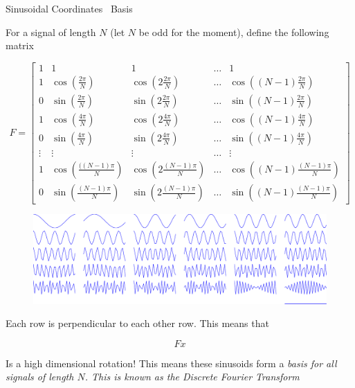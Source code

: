 \documentclass{beamer}
\begin{document}
\begin{frame}{Sinusoidal Coordinates \ Basis}

\tiny For a signal of length $N$ (let $N$ be odd for the moment), define the following matrix

\tiny
\[ F = \left[ \begin{array}{ccccc} 1 & 1 & 1 & \hdots & 1 \\ 1 & \cos(\frac{2\pi}{N}) & \cos(2\frac{2\pi}{N}) & \hdots & \cos((N-1)\frac{2\pi}{N})   \\ 0 & \sin(\frac{2\pi}{N}) & \sin(2\frac{2\pi}{N}) & \hdots & \sin((N-1)\frac{2\pi}{N}) \\ 

1 & \cos(\frac{4\pi}{N}) & \cos(2\frac{4\pi}{N}) & \hdots & \cos((N-1)\frac{4\pi}{N})   \\ 0 & \sin(\frac{4\pi}{N}) & \sin(2\frac{4\pi}{N}) & \hdots & \sin((N-1)\frac{4\pi}{N})

\\ \vdots & \vdots & \vdots & \hdots & \vdots \\

1 & \cos(\frac{((N-1)\pi}{N}) & \cos(2\frac{(N-1)\pi}{N}) & \hdots & \cos((N-1)\frac{(N-1)\pi}{N})   \\ 0 & \sin(\frac{(N-1)\pi}{N}) & \sin(2\frac{(N-1)\pi}{N}) & \hdots & \sin((N-1)\frac{(N-1)\pi}{N})


    \end{array} \right] \]

\begin{figure}[t]
    \includegraphics[width=\textwidth]{FourierBasis.pdf}
\end{figure}

\end{frame}


\begin{frame}

Each row is perpendicular to each other row.  This means that

\[ Fx \]

Is a high dimensional rotation!  This means these sinusoids form a \em{basis} for all signals of length $N$.  This is known as the {\em Discrete Fourier Transform}

\end{frame}
\end{document}
